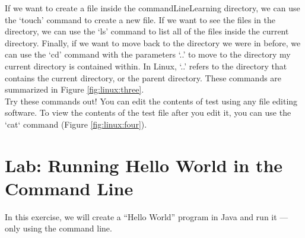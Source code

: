 If we want to create a file inside the commandLineLearning directory, we can use the ‘touch’ command to create a new file. If we want to see the files in the directory, we can use the ‘ls’ command to list all of the files inside the current directory. Finally, if we want to move back to the directory we were in before, we can use the ‘cd’ command with the parameters ‘..’ to move to the directory my current directory is contained within. In Linux, ‘..’ refers to the directory that contains the current directory, or the parent directory. These commands are summarized in Figure \ref{fig:linux:three}. \\

Try these commands out! You can edit the contents of test using any file editing software. To view the contents of the test file after you edit it, you can use the `cat` command (Figure \ref{fig:linux:four}). \\


\section{Lab: Running Hello World in the Command Line}

In this exercise, we will create a ``Hello World'' program in Java and run it --- only using the command line.

